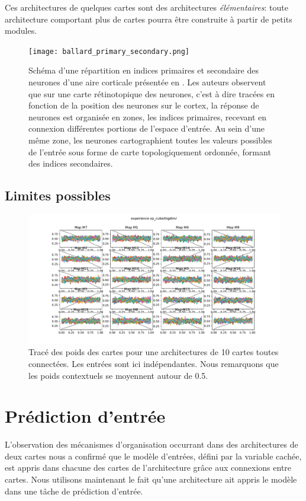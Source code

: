 \documentclass[../main]{subfiles}
\begin{document}
Ces architectures de quelques cartes sont des architectures \emph{élémentaires}: toute architecture comportant plus de cartes pourra être construite à partir de petits modules. 
\begin{figure}
	\centering\texttt{[image: ballard\_primary\_secondary.png]}
	\caption{Schéma d'une répartition en indices primaires et secondaire des neurones d'une aire corticale présentée en \cite{ballard_cortical_1986}. Les auteurs observent que sur une carte rétinotopique des neurones, c'est à dire tracées en fonction de la position des neurones sur le cortex, la réponse de neurones est organisée en zones, les indices primaires, recevant en connexion différentes portions de l'espace d'entrée. Au sein d'une même zone, les neurones cartographient toutes les valeurs possibles de l'entrée sous forme de carte topologiquement ordonnée, formant des indices secondaires.\label{fig:ballard}}
\end{figure}

\subsection{Limites possibles}

\begin{figure}
	\includegraphics[width=\textwidth]{xp_cube_bigdim.pdf}
	\caption{Tracé des poids des cartes pour une architectures de 10 cartes toutes connectées. Les entrées sont ici indépendantes. Nous remarquons que les poids contextuels se moyennent autour de 0.5.}
\end{figure}

\section{Prédiction d'entrée}

L'observation des mécanismes d'organisation occurrant dans des architectures de deux cartes nous a confirmé que le modèle d'entrées, défini par la variable cachée, est appris dans chacune des cartes de l'architecture grâce aux connexions entre cartes.
Nous utilisons maintenant le fait qu'une architecture ait appris le modèle dans une tâche de prédiction d'entrée.
\end{document}
